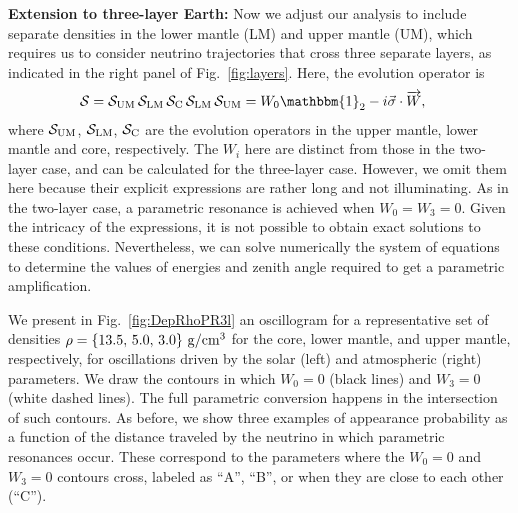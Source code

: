 \vspace{0.5cm}
\textbf{Extension to three-layer Earth:} Now we adjust our analysis to include separate densities in the lower mantle (LM) and upper mantle (UM), which requires us to consider neutrino trajectories that cross three separate layers, as indicated in the right panel of Fig.~\ref{fig:layers}. Here, the evolution operator is
\begin{align}
	{\cal S} &= {\cal S}_{\rm UM}\,{\cal S}_{\rm LM}\,{\cal S}_{\rm C}\,{\cal S}_{\rm LM}\,{\cal S}_{\rm UM} = W_0 \mathbbm{1}_2 - i \vec{\sigma}\cdot\overrightarrow{W},
\end{align}
where ${\cal S}_{\rm UM}$,  ${\cal S}_{\rm LM}$,  ${\cal S}_{\rm C}$ are the evolution operators in the upper mantle, lower mantle and core, respectively. The $W_i$ here are distinct from those in the two-layer case, and can be calculated for the three-layer case. However, we omit them here because their explicit expressions are rather long and not illuminating. As in the two-layer case, a parametric resonance is achieved when $W_0=W_3=0$. Given the intricacy of the expressions, it is not possible to obtain exact solutions to these conditions. Nevertheless, we can solve numerically the system of equations to determine the values of energies and zenith angle required to get a parametric amplification. 

We present in Fig.~\ref{fig:DepRhoPR3l} an oscillogram for a representative set of densities $\rho=\{13.5,\,5.0,\,3.0\}~{\rm g/cm^{3}}$ for the core, lower mantle, and upper mantle, respectively, for oscillations driven by the solar (left) and atmospheric (right) parameters.
We draw the contours in which $W_0=0$ (black lines) and $W_3=0$ (white dashed lines).
The full parametric conversion happens in the intersection of such contours.
As before, we show three examples of appearance probability as a function of the distance traveled by the neutrino in which  parametric resonances occur.
These correspond to the parameters where the $W_0=0$ and $W_3=0$ contours cross, labeled as ``A'', ``B'', or when they are close to each other (``C'').


